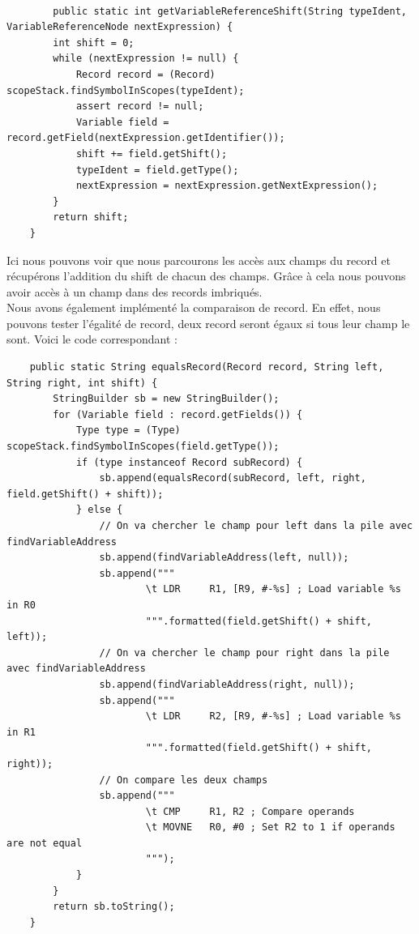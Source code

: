 \documentclass[french,a4paper]{article}
\begin{document}
    \begin{lstlisting}

        public static int getVariableReferenceShift(String typeIdent, VariableReferenceNode nextExpression) {
        int shift = 0;
        while (nextExpression != null) {
            Record record = (Record) scopeStack.findSymbolInScopes(typeIdent);
            assert record != null;
            Variable field = record.getField(nextExpression.getIdentifier());
            shift += field.getShift();
            typeIdent = field.getType();
            nextExpression = nextExpression.getNextExpression();
        }
        return shift;
    }
    \end{lstlisting}

    Ici nous pouvons voir que nous parcourons les accès aux champs du record et récupérons l'addition du shift de chacun des champs. Grâce à cela nous pouvons avoir accès à un champ dans des records imbriqués.\\

    Nous avons également implémenté la comparaison de record. En effet, nous pouvons tester l'égalité de record, deux record seront égaux si tous leur champ le sont. Voici le code correspondant :
    \begin{lstlisting}
    public static String equalsRecord(Record record, String left, String right, int shift) {
        StringBuilder sb = new StringBuilder();
        for (Variable field : record.getFields()) {
            Type type = (Type) scopeStack.findSymbolInScopes(field.getType());
            if (type instanceof Record subRecord) {
                sb.append(equalsRecord(subRecord, left, right, field.getShift() + shift));
            } else {
                // On va chercher le champ pour left dans la pile avec findVariableAddress
                sb.append(findVariableAddress(left, null));
                sb.append("""
                        \t LDR     R1, [R9, #-%s] ; Load variable %s in R0
                        """.formatted(field.getShift() + shift, left));
                // On va chercher le champ pour right dans la pile avec findVariableAddress
                sb.append(findVariableAddress(right, null));
                sb.append("""
                        \t LDR     R2, [R9, #-%s] ; Load variable %s in R1
                        """.formatted(field.getShift() + shift, right));
                // On compare les deux champs
                sb.append("""
                        \t CMP     R1, R2 ; Compare operands
                        \t MOVNE   R0, #0 ; Set R2 to 1 if operands are not equal
                        """);
            }
        }
        return sb.toString();
    }
    \end{lstlisting}
\end{document}
